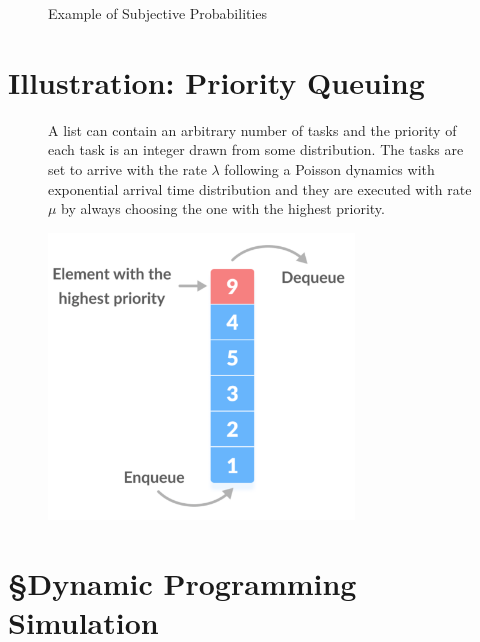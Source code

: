 \documentclass[
]{report}
\begin{document}
\begin{figure}
\begin{minipage}[t]{0.50\linewidth}
{{}

}

\end{minipage}%

\caption{\label{fig-prob-weighting}Example of Subjective Probabilities}

\end{figure}

\hypertarget{illustration-priority-queuing}{%
\section{Illustration: Priority
Queuing}\label{illustration-priority-queuing}}

\begin{figure}

\begin{minipage}[t]{0.50\linewidth}

{\centering 

A list can contain an arbitrary number of tasks and the priority of each
task is an integer drawn from some distribution. The tasks are set to
arrive with the rate \(\lambda\) following a Poisson dynamics with
exponential arrival time distribution and they are executed with rate
\(\mu\) by always choosing the one with the highest priority.

}

\end{minipage}%

\caption{\label{fig-prioq}\includegraphics[width=3.2in,height=\textheight]{images/prioq-illustration.png}}

\end{figure}

\hypertarget{dynamic-programming-simulation}{%
\section{§Dynamic Programming
Simulation}\label{dynamic-programming-simulation}}
\end{document}
